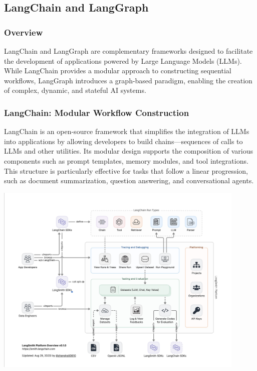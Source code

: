 \subsection{LangChain and LangGraph}

\subsubsection{Overview}
LangChain and LangGraph are complementary frameworks designed to facilitate the development of applications powered by Large Language Models (LLMs). While LangChain provides a modular approach to constructing sequential workflows, LangGraph introduces a graph-based paradigm, enabling the creation of complex, dynamic, and stateful AI systems.

\subsubsection{LangChain: Modular Workflow Construction}
LangChain is an open-source framework that simplifies the integration of LLMs into applications by allowing developers to build chains—sequences of calls to LLMs and other utilities. Its modular design supports the composition of various components such as prompt templates, memory modules, and tool integrations. This structure is particularly effective for tasks that follow a linear progression, such as document summarization, question answering, and conversational agents.

\begin{center}
    \centering
    \includegraphics[width=0.9\textwidth]{Images/Langchain Architecture.png}
     \cite{langchainArchitecture}
    \label{fig:langchain_architecture}
\end{center}

